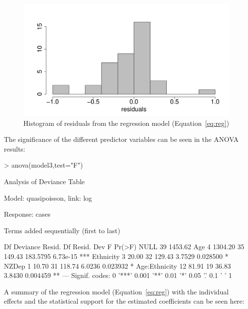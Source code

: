 \documentclass{article}
\begin{document}
\begin{figure}[h!]
\begin{center}
\includegraphics{interimreport2-017}
\end{center}
\caption{Histogram of residuals from the regression model (Equation~\ref{eq:reg})}
\label{fig:resid}
\end{figure}
The significance of the different predictor variables can be seen in the ANOVA results:

\begin{Schunk}
\begin{Sinput}
> anova(model3,test="F")
\end{Sinput}
\begin{Soutput}
Analysis of Deviance Table

Model: quasipoisson, link: log

Response: cases

Terms added sequentially (first to last)


              Df Deviance Resid. Df Resid. Dev        F   Pr(>F)    
NULL                             39    1453.62                      
Age            4  1304.20        35     149.43 183.5795 6.73e-15 ***
Ethnicity      3    20.00        32     129.43   3.7529 0.028500 *  
NZDep          1    10.70        31     118.74   6.0236 0.023932 *  
Age:Ethnicity 12    81.91        19      36.83   3.8430 0.004459 ** 
---
Signif. codes:  0 '***' 0.001 '**' 0.01 '*' 0.05 '.' 0.1 ' ' 1
\end{Soutput}
\end{Schunk}

A summary of the regression model (Equation~\ref{eq:reg}) with the individual effects and the statistical support for the estimated coefficients can be seen here:
\end{document}
